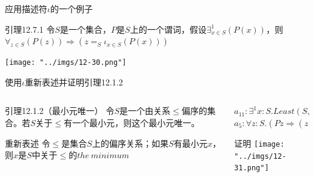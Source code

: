 \documentclass[UTF8,aspectratio=169,mathserif]{beamer}
\begin{document}
		\begin{frame}[shrink]{应用描述符$\iota$的一个例子}
			\begin{exampleblock}{引理12.7.1}
				令$S$是一个集合，$P$是$S$上的一个谓词，假设$\exists^1_{x\in S}(P(x))$，则$\forall_{z\in S}(P(z))\Rightarrow(z=_S\iota_{x\in S}(P(x)))$
			\end{exampleblock}
			\texttt{[image: "../imgs/12-30.png"]}
		\end{frame}
	
		\begin{frame}[shrink]{使用$\iota$重新表述并证明引理12.1.2}
			\begin{columns}
				\begin{column}{0.4\textwidth}
					\begin{exampleblock}{引理12.1.2（最小元唯一）}
						令$S$是一个由关系$\le$偏序的集合。若$S$关于$\le$有一个最小元，则这个最小元唯一。
					\end{exampleblock}
					\begin{block}{重新表述}
						令$\le$是集合$S$上的偏序关系；如果$S$有最小元$x$，则$x$是$S$中关于$\le$的$the\ minimum$
					\end{block}
				\end{column}
				\begin{column}{0.6\textwidth}
					$a_{11}:\exists^1x:S.Least(S,\le,x)$\\
					$a_5:\forall z:S.(Pz\Rightarrow(z=_S\iota^u_{x:S}(Px)))$
					\begin{block}{证明}
						\texttt{[image: "../imgs/12-31.png"]}
					\end{block}
				\end{column}
			\end{columns}
		\end{frame}
\end{document}

